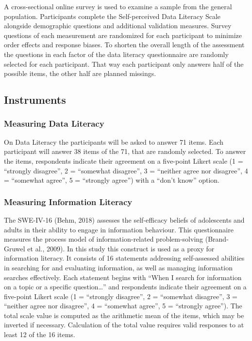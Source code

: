 \documentclass[
  12pt,
  a4paper,
  twoside]{article}
\begin{document}
A cross-sectional online survey is used to examine a sample from the general population. Participants complete the Self-perceived Data Literacy Scale alongside demographic questions and additional validation measures. Survey questions of each measurement are randomized for each participant to minimize order effects and response biases. To shorten the overall length of the assessment the questions in each factor of the data literacy questionnaire are randomly selected for each participant. That way each participant only answers half of the possible items, the other half are planned missings.

\subsection{Instruments}\label{instruments}

\subsubsection{Measuring Data Literacy}\label{measuring-data-literacy}

On Data Literacy the participants will be asked to answer 71
items. Each participant will answer 38 items of the 71, that are randomly selected.
To answer the items, respondents indicate their agreement on a five-point Likert
scale (1 = ``strongly disagree'', 2 = ``somewhat disagree'', 3 = ``neither agree nor
disagree'', 4 = ``somewhat agree'', 5 = ``strongly agree'') with a ``don't know''
option.

\subsubsection{Measuring Information Literacy}\label{measuring-information-literacy}

The SWE-IV-16 (Behm, 2018) assesses the self-efficacy beliefs
of adolescents and adults in their ability to engage in information behaviour. This
questionnaire measures the process model of information-related problem-solving
(Brand-Gruwel et al., 2009). In this study this construct is used as a proxy for information literacy.
It consists of 16 statements addressing self-assessed
abilities in searching for and evaluating information, as well as managing
information searches effectively. Each statement begins with ``When I search for
information on a topic or a specific question\ldots{}'' and respondents indicate their
agreement on a five-point Likert scale (1 = ``strongly disagree'', 2 = ``somewhat
disagree'', 3 = ``neither agree nor disagree'', 4 = ``somewhat agree'', 5 = ``strongly
agree''). The total scale value is computed as the arithmetic
mean of the items, which may be inverted if necessary. Calculation of the total value
requires valid responses to at least 12 of the 16 items.
\end{document}
